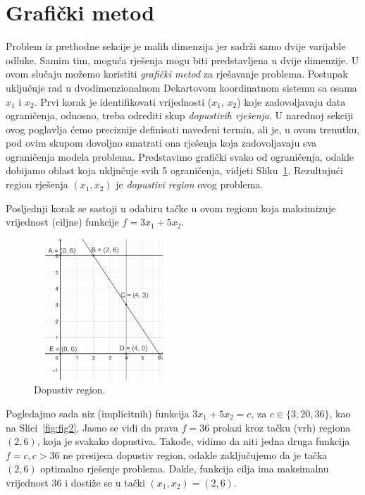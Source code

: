 \documentclass[a4paper, utf8, 11pt, colorlinks]{book}
\theoremstyle{definition}
\begin{document}
\section{Grafički metod}
 Problem iz prethodne sekcije je malih dimenzija jer sadrži samo dvije varijable odluke. Samim tim,  moguća rješenja mogu biti predstavljena u dvije dimenzije. U ovom slučaju možemo koristiti \emph{grafički metod} za rješavanje problema. Postupak uključuje rad u dvodimenzionalnom Dekartovom koordinatnom sistemu sa osama $x_1$ i $x_2$.  Prvi korak je identifikovati vrijednosti ($x_1$, $x_2$) koje zadovoljavaju data ograničenja, odnosno, treba odrediti skup \emph{dopustivih rješenja}.    U narednoj sekciji ovog poglavlja ćemo preciznije definisati navedeni termin, ali je, u ovom trenutku, pod ovim skupom dovoljno smatrati ona rješenja koja zadovoljavaju sva ograničenja modela  problema. Predstavimo grafički svako od ograničenja, odakle dobijamo oblast koja uključuje svih 5 ograničenja, vidjeti Sliku~\ref{fig:fig1}.  Rezultujući region rješenja $(x_1, x_2)$ je \emph{dopustivi region} ovog problema.
 
 Posljednji korak se sastoji u odabiru tačke u ovom regionu  koja maksimizuje vrijednost (ciljne) funkcije $f = 3x_1 + 5x_2$. 

\begin{figure}
    \centering
    \includegraphics[width=150pt,height=150pt]{fig1.eps}
    \caption{Dopustiv region.}
    \label{fig:fig1}
\end{figure}
Pogledajmo sada niz (implicitnih) funkcija $3x_1 + 5 x_2 = c$, za $c \in \{3,20, 36\}$, kao na Slici~\ref{fig:fig2}. Jasno se vidi da prava $f = 36$ prolazi kroz tačku (vrh) regiona $(2,6)$, koja je svakako dopustiva. Takođe, vidimo da niti jedna druga funkcija $f=c, c > 36$ ne presijeca dopustiv region, odakle zaključujemo da je tačka $(2, 6)$ optimalno rješenje problema. Dakle, funkcija cilja ima maksimalnu vrijednost 36 i dostiže se u tački $(x_1, x_2)=(2,6)$.
\end{document}
